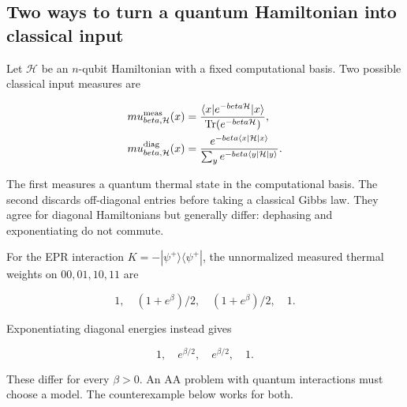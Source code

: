 \subsection{Two ways to turn a quantum Hamiltonian into classical
input}\label{quant:sec-1}

Let \(\mathcal H\) be an \(n\)-qubit Hamiltonian with a fixed
computational basis. Two possible classical input measures are

\[
\begin{aligned}
\mu_{\beta,\mathcal H}^{\rm meas}(x)
&=\frac{\langle x|e^{-\beta\mathcal H}|x\rangle}{\operatorname{Tr}(e^{-\beta\mathcal H})},\\
\mu_{\beta,\mathcal H}^{\rm diag}(x)
&=\frac{e^{-\beta\langle x|\mathcal H|x\rangle}}
{\sum_y e^{-\beta\langle y|\mathcal H|y\rangle}}.
\end{aligned}
\]

The first measures a quantum thermal state in the computational basis.
The second discards off-diagonal entries before taking a classical Gibbs
law. They agree for diagonal Hamiltonians but generally differ:
dephasing and exponentiating do not commute.

For the EPR interaction \(K=-|\psi^+\rangle\langle\psi^+|\), the
unnormalized measured thermal weights on \(00,01,10,11\) are

\[
1,\quad(1+e^\beta)/2,\quad(1+e^\beta)/2,\quad1.
\]

Exponentiating diagonal energies instead gives

\[
1,\quad e^{\beta/2},\quad e^{\beta/2},\quad1.
\]

These differ for every \(\beta>0\). An AA problem with quantum
interactions must choose a model. The counterexample below works for
both.

